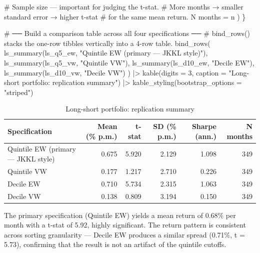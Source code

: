 \documentclass[
  letterpaper,
  DIV=11,
  numbers=noendperiod]{scrartcl}
\newenvironment{Shaded}{\begin{snugshade}}{\end{snugshade}}
\newcommand{\AttributeTok}[1]{\textcolor[rgb]{0.40,0.45,0.13}{#1}}
\newcommand{\CommentTok}[1]{\textcolor[rgb]{0.37,0.37,0.37}{#1}}
\newcommand{\DecValTok}[1]{\textcolor[rgb]{0.68,0.00,0.00}{#1}}
\newcommand{\FunctionTok}[1]{\textcolor[rgb]{0.28,0.35,0.67}{#1}}
\newcommand{\NormalTok}[1]{\textcolor[rgb]{0.00,0.23,0.31}{#1}}
\newcommand{\OtherTok}[1]{\textcolor[rgb]{0.00,0.23,0.31}{#1}}
\newcommand{\SpecialCharTok}[1]{\textcolor[rgb]{0.37,0.37,0.37}{#1}}
\newcommand{\StringTok}[1]{\textcolor[rgb]{0.13,0.47,0.30}{#1}}
\begin{document}
\begin{Shaded}
\begin{Highlighting}[]
    \CommentTok{\# Sample size — important for judging the t{-}stat.}
    \CommentTok{\# More months → smaller standard error → higher t{-}stat}
    \CommentTok{\# for the same mean return.}
    \StringTok{\textasciigrave{}}\AttributeTok{N months}\StringTok{\textasciigrave{}} \OtherTok{=}\NormalTok{ n}
\NormalTok{  )}
\NormalTok{\}}

\CommentTok{\# ── Build a comparison table across all four specifications ──}
\CommentTok{\# bind\_rows() stacks the one{-}row tibbles vertically into a 4{-}row table.}
\FunctionTok{bind\_rows}\NormalTok{(}
  \FunctionTok{ls\_summary}\NormalTok{(ls\_q5\_ew,  }\StringTok{"Quintile EW (primary — JKKL style)"}\NormalTok{),}
  \FunctionTok{ls\_summary}\NormalTok{(ls\_q5\_vw,  }\StringTok{"Quintile VW"}\NormalTok{),}
  \FunctionTok{ls\_summary}\NormalTok{(ls\_d10\_ew, }\StringTok{"Decile EW"}\NormalTok{),}
  \FunctionTok{ls\_summary}\NormalTok{(ls\_d10\_vw, }\StringTok{"Decile VW"}\NormalTok{)}
\NormalTok{) }\SpecialCharTok{|\textgreater{}}
  \FunctionTok{kable}\NormalTok{(}\AttributeTok{digits =} \DecValTok{3}\NormalTok{, }\AttributeTok{caption =} \StringTok{"Long{-}short portfolio: replication summary"}\NormalTok{) }\SpecialCharTok{|\textgreater{}}
  \FunctionTok{kable\_styling}\NormalTok{(}\AttributeTok{bootstrap\_options =} \StringTok{"striped"}\NormalTok{)}
\end{Highlighting}
\end{Shaded}

\begin{longtable}[t]{lrrrrr}
\caption{\label{tab:table2-replication}Long-short portfolio: replication summary}\\
\toprule
Specification & Mean (\% p.m.) & t-stat & SD (\% p.m.) & Sharpe (ann.) & N months\\
\midrule
Quintile EW (primary — JKKL style) & 0.675 & 5.920 & 2.129 & 1.098 & 349\\
Quintile VW & 0.177 & 1.217 & 2.710 & 0.226 & 349\\
Decile EW & 0.710 & 5.734 & 2.315 & 1.063 & 349\\
Decile VW & 0.138 & 0.809 & 3.194 & 0.150 & 349\\
\bottomrule
\end{longtable}

The primary specification (Quintile EW) yields a mean return of 0.68\%
per month with a t-stat of 5.92, highly significant. The return pattern
is consistent across sorting granularity --- Decile EW produces a
similar spread (0.71\%, t = 5.73), confirming that the result is not an
artifact of the quintile cutoffs.
\end{document}
